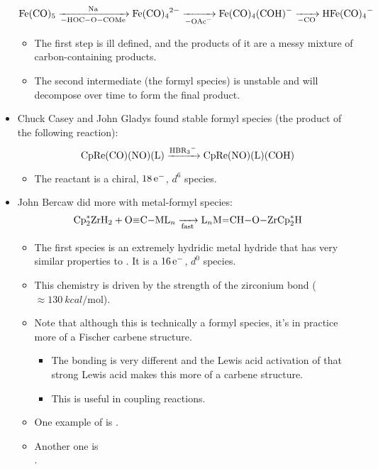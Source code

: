 \documentclass[../notes.tex]{subfiles}
\begin{document}
\begin{itemize}
\begin{equation*}
        \ce{Fe(CO)5 ->[Na][-HOC-O-COMe] Fe(CO)4^2- ->[][-OAc^-] Fe(CO)4(COH)- ->[][-CO] HFe(CO)4-}
    \end{equation*}
    \begin{itemize}
        \item The first step is ill defined, and the products of it are a messy mixture of carbon-containing products.
        \item The second intermediate (the formyl species) is unstable and will decompose over time to form the final product.
    \end{itemize}
    \item Chuck Casey and John Gladys found stable formyl species (the product of the following reaction):
    \begin{equation*}
        \ce{CpRe(CO)(NO)(L) ->[HBR3^-] CpRe(NO)(L)(COH)}
    \end{equation*}
    \begin{itemize}
        \item The reactant is a chiral, $18\,\e[-]$, $d^6$ species.
    \end{itemize}
    \item John Bercaw did more with metal-formyl species:
    \begin{equation*}
        \ce{Cp^*2ZrH2 + O#C-ML_n ->[][fast] L_nM=CH-O-ZrCp^*2H}
    \end{equation*}
    \begin{itemize}
        \item The first species is an extremely hydridic metal hydride that has very similar properties to . It is a $16\,\e[-]$, $d^0$ species.
        \item This chemistry is driven by the strength of the zirconium bond ($\approx\SI{130}{kcal\per\mole}$).
        \item Note that although this is technically a formyl species, it's in practice more of a Fischer carbene structure.
        \begin{itemize}
            \item The bonding is very different and the Lewis acid activation of that strong  Lewis acid makes this more of a carbene structure.
            \item This is useful in  coupling reactions.
        \end{itemize}
        \item One example of  is .
        \item Another one is \\ .

\end{itemize}
\end{itemize}
\end{document}
